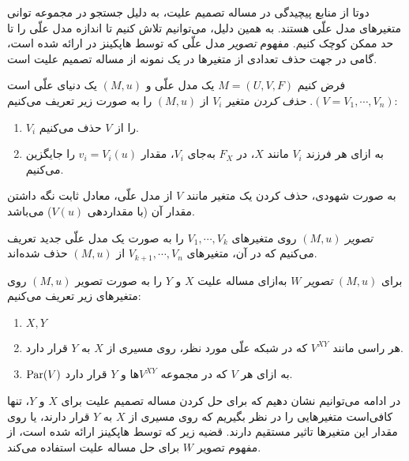 دوتا از منابع پیچیدگی در مساله تصمیم علیت،
به دلیل جستجو در مجموعه توانی متغیرهای مدل علّی هستند.
به همین دلیل، می‌توانیم تلاش کنیم تا اندازه مدل علّی را
تا حد ممکن کوچک کنیم. مفهوم
\textit{تصویر}
مدل علّی که توسط هاپکینز در
\cite{hopkins2002strategies}
ارائه شده است،
گامی در جهت حذف تعدادی از متغیرها در
یک نمونه
از مساله تصمیم علیت است.

\begin{definition}\label{def:variable-deletion}
  فرض کنیم
  $M=(U,V,F)$
  یک مدل علّی و
  $(M,u)$
  یک دنیای علّی است
  $(V={V_1,\cdots,V_n})$.
  \textit{حذف کردن}
  متغیر
  $V_i$
  از
  $(M,u)$
  را به صورت زیر تعریف می‌کنیم:
  \begin{enumerate}[label=(\alph*)]
    \item $V_i$
    را از
    $V$
    حذف می‌کنیم.
    \item
    به ازای هر فرزند
    $V_i$
    مانند
    $X$،
    در
    $F_X$
    به‌جای
    $V_i$،
    مقدار
    $v_i=V_i(u)$
    را جایگزین می‌کنیم.
  \end{enumerate}
\end{definition}

به صورت شهودی، حذف کردن یک متغیر مانند
$V$
از مدل علّی، معادل ثابت نگه داشتن مقدار آن
(با مقداردهی $V(u)$)
می‌باشد.

\begin{definition}\label{def:projection}
  \textit{تصویر} $(M,u)$
  روی متغیرهای
  $V_1,\cdots,V_k$
  را به صورت یک مدل علّی جدید تعریف می‌کنیم
  که در آن، متغیرهای
  $V_{k+1},\cdots,V_n$
  از
  $(M,u)$
  حذف شده‌اند.
\end{definition}

\begin{definition}\label{def:w-projection}
  برای
  $(M,u)$
  \textit{تصویر $W$}
  به‌ازای مساله علیت
  $X$ و $Y$
  را به صورت تصویر
  $(M,u)$
  روی متغیرهای زیر تعریف می‌کنیم:
  \begin{enumerate}[label=(\alph*)]
    \item $X,Y$
    \item هر راسی مانند
    $V^{XY}$
    که در شبکه علّی مورد نظر،
    روی مسیری از
    $X$ به $Y$
    قرار دارد.
    \item $\operatorname{Par}(V)$
    به ازای هر
    $V$
    که در مجموعه
    $V^{XY}$ها
    و $Y$
    قرار دارد.
  \end{enumerate}
\end{definition}

در ادامه می‌توانیم نشان دهیم که
برای حل کردن مساله تصمیم علیت برای
$X$ و $Y$،
تنها کافی‌است متغیرهایی را در نظر بگیریم که
روی مسیری از
$X$ به $Y$
قرار دارند، یا روی مقدار این متغیرها
تاثیر مستقیم دارند.
قضیه زیر که توسط هاپکینز ارائه شده است،
از مفهوم
تصویر $W$
برای حل مساله علیت استفاده می‌کند.


